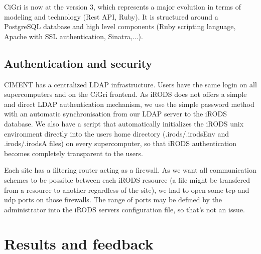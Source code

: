 \documentclass[a4paper, 10pt]{article}
\begin{document}
\begin{multicols}{2}
CiGri is now at the version 3, which represents a major evolution in terms of modeling and technology (Rest API, Ruby). It is structured around a PostgreSQL database and high level components (Ruby scripting language, Apache with SSL authentication, Sinatra,...).


\subsection{Authentication and security}

CIMENT has a centralized LDAP infrastructure. Users have the same login on all supercomputers and on the CiGri frontend. As iRODS does not offers a simple and direct LDAP authentication mechanism, we use the simple password method with an automatic synchronisation from our LDAP server to the iRODS database. We also have a script that automatically initializes the iRODS unix environment directly into the users home directory (.irods/.irodsEnv and .irods/.irodsA files) on every supercomputer, so that iRODS authentication becomes completely transparent to the users.

Each site has a filtering router acting as a firewall. As we want all communication schemes to be possible between each iRODS resource (a file might be transfered from a resource to another regardless of the site), we had to open some tcp and udp ports on those firewalls. The range of ports may be defined by the administrator into the iRODS servers configuration file, so that's not an issue.



\section{Results and feedback} %


\end{multicols}
\end{document}
